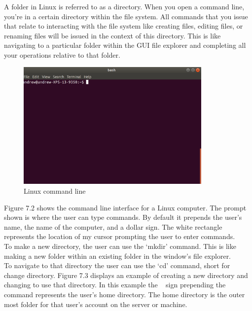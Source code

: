   A folder in Linux is referred to as a directory. When you open a command line, you’re in a certain directory within the file system. All commands that you issue that relate to interacting with the file system like creating files, editing files, or renaming files will be issued in the context of this directory. This is like navigating to a particular folder within the GUI file explorer and completing all your operations relative to that folder. 

\begin{figure}
	\centering
	\includegraphics[width=0.85\textwidth]{lectures/images/commandLineOne.png}
	\caption{Linux command line}
	\label{fig:linux:one}
\end{figure}

Figure 7.2 shows the command line interface for a Linux computer. The prompt shown is where the user can type commands. By default it prepends the user’s name, the name of the computer, and a dollar sign. The white rectangle represents the location of my cursor prompting the user to enter commands. \\

To make a new directory, the user can use the ‘mkdir’ command. This is like making a new folder within an existing folder in the window’s file explorer. \\

To navigate to that directory the user can use the ‘cd’ command, short for change directory. Figure 7.3 displays an example of creating a new directory and changing to use that directory. In this example the ~ sign prepending the command represents the user’s home directory. The home directory is the outer most folder for that user’s account on the server or machine. \\

